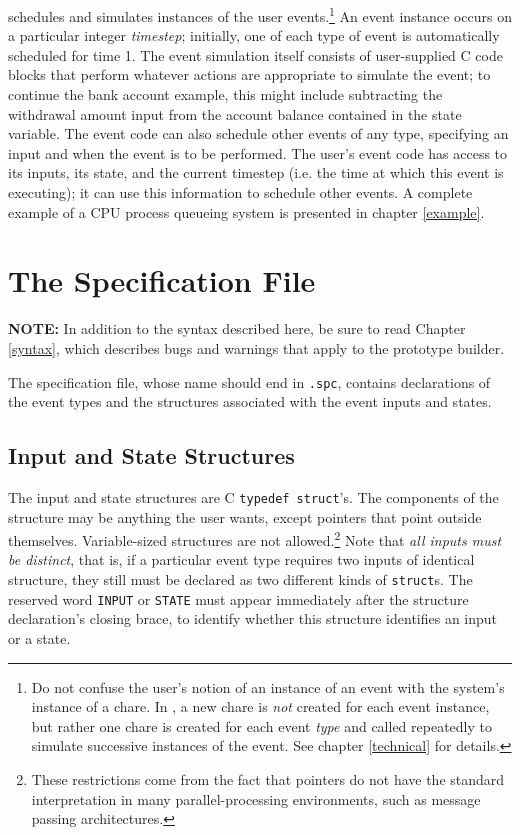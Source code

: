 \dispare schedules and simulates instances of the user
events.\footnote{Do not confuse the user's notion of an instance of an
event with the system's instance of a chare.  In \dispare, a new chare
is {\em not} created for each event instance, but rather one chare is
created for each event {\em type} and called repeatedly to simulate
successive instances of the event.  See chapter \ref{technical} for
details.}  An event instance occurs on a particular integer {\em timestep};
initially, one of each type of event is automatically scheduled for time
1.  The event simulation itself consists of user-supplied C code blocks
that perform whatever actions are appropriate to simulate the event; to
continue the bank account example, this might include subtracting the
withdrawal amount input from the account balance contained in the state
variable.  The event code can also schedule other events of any type,
specifying an input and when the event is to be performed.  The user's
event code has access to its inputs, its state, and the current timestep
(i.e. the time at which this event is executing); it can use this
information to schedule other events.  A complete example of a CPU
process queueing system is presented in chapter \ref{example}.


\section{The Specification File}

{\bf NOTE:}  In addition to the syntax described here, be sure to read
Chapter \ref{syntax}, which describes bugs and warnings that apply to the
prototype builder.

The specification file, whose name should end in {\tt .spc}, contains
declarations of the event types and the structures associated with the
event inputs and states.

\subsection{Input and State Structures}

The input and state structures are C {\tt typedef struct}'s.  The
components of the structure may be anything the user wants, except
pointers that point outside themselves.  Variable-sized structures are
not allowed.\footnote{These restrictions come from the fact that
pointers do not have the standard interpretation in many
parallel-processing environments, such as message passing
architectures.} Note that {\em all inputs must be distinct}, that is, if
a particular event type requires two inputs of identical structure, they
still must be declared as two different kinds of {\tt struct}s.  The
\dispare reserved word {\tt INPUT} or {\tt STATE} must appear
immediately after the structure declaration's closing brace, to identify
whether this structure identifies an input or a state.

